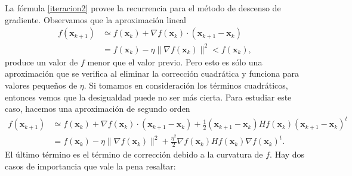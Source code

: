 \documentclass[12pt, a4paper]{amsbook}
\newcommand{\xx}{{\mathbf x}}
\theoremstyle{remark}
\theoremstyle{definition}
\numberwithin{section}{chapter}
\numberwithin{subsection}{section}
\numberwithin{equation}{section}
\numberwithin{figure}{chapter}
\begin{document}
La fórmula \eqref{iteracion2} provee la recurrencia para el método de descenso de gradiente. Observamos que la aproximación lineal
\begin{align*}
f(\xx_{k+1}) &\simeq f(\xx_k) + \nabla f(\xx_k)\cdot (\xx_{k+1}-\xx_k)\\
&= f(\xx_k) - \eta \|\nabla f(\xx_k)\|^2 < f(\xx_k),
\end{align*}
produce un valor de $f$ menor que el valor previo. Pero esto es sólo una aproximación que se verifica al eliminar la corrección cuadrática y funciona para valores pequeños de $\eta$. Si tomamos en consideración los términos cuadráticos, entonces vemos que la desigualdad puede no ser más cierta. Para estudiar este caso, hacemos una aproximación de segundo orden
\begin{align*}
f(\xx_{k+1}) &\simeq f(\xx_k) + \nabla f(\xx_k)\cdot (\xx_{k+1}-\xx_k) + \frac12 (\xx_{k+1}-\xx_k) Hf(\xx_k) (\xx_{k+1}-\xx_k)^t\\
&=  f(\xx_k) - \eta \|\nabla f(\xx_k)\|^2 + \frac{\eta^2}{2} \nabla f(\xx_k) Hf(\xx_k) \nabla f(\xx_k)^t.
\end{align*}
El último término es el término de corrección debido a la curvatura de $f$. Hay dos casos de importancia que vale la pena resaltar:
\end{document}
